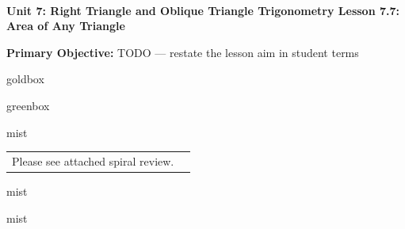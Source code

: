 \documentclass[10pt]{article}
\newcommand{\UnitNumberName}{Unit 7: Right Triangle and Oblique Triangle Trigonometry \quad}
\newcommand{\LessonNumberName}{Lesson 7.7: Area of Any Triangle}
\begin{document}
\begin{center}
    {\Large\bfseries \CourseName \\
    {\small\bfseries \UnitNumberName \LessonNumberName}}
\end{center}

\begin{tcolorbox}[colback=mist, colframe=royal, boxrule=0.9pt, arc=2mm,
    left=2mm, right=2mm, top=1.5mm, bottom=1.5mm]
    \textbf{Primary Objective:} TODO --- restate the lesson aim in student terms
\end{tcolorbox}

\renewcommand{\arraystretch}{1.6}
\begin{skillbox}{goldbox}
\end{skillbox}

\begin{skillbox}{greenbox}
\end{skillbox}

\begin{fixedskillbox}{mist}
    \begin{tabularx}{\linewidth}{@{}X c@{}}
        \begin{minipage}[t]{0.55\linewidth}\vspace{0pt}
            Please see attached spiral review.  %
        \end{minipage}
        &
        \begin{minipage}[t]{0.38\linewidth}\vspace{0pt}\centering
        \end{minipage}
    \end{tabularx}
\end{fixedskillbox}

\begin{skillbox}[Hook]{mist}
\end{skillbox}

\begin{skillbox}[Lesson]{mist}
\end{skillbox}
\end{document}
